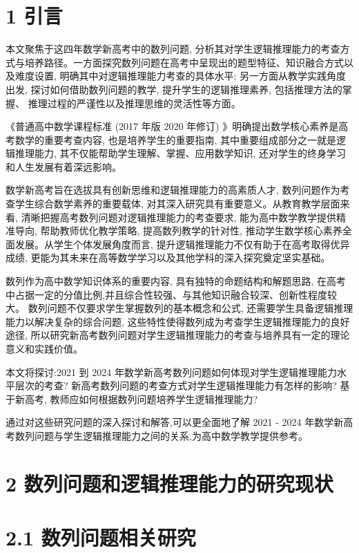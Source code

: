 \documentclass[10pt]{article}
\begin{document}
\section*{1 引言}

本文聚焦于这四年数学新高考中的数列问题, 分析其对学生逻辑推理能力的考查方式与培养路径。一方面探究数列问题在高考中呈现出的题型特征、知识融合方式以及难度设置, 明确其中对逻辑推理能力考查的具体水平; 另一方面从教学实践角度出发, 探讨如何借助数列问题的教学, 提升学生的逻辑推理素养, 包括推理方法的掌握、 推理过程的严谨性以及推理思维的灵活性等方面。

《普通高中数学课程标准 (2017 年版 2020 年修订) 》明确提出数学核心素养是高考数学的重要考查内容, 也是培养学生的重要指南, 其中重要组成部分之一就是逻辑推理能力, 其不仅能帮助学生理解、掌握、应用数学知识, 还对学生的终身学习和人生发展有着深远影响。

数学新高考旨在选拔具有创新思维和逻辑推理能力的高素质人才, 数列问题作为考查学生综合数学素养的重要载体, 对其深入研究具有重要意义。从教育教学层面来看, 清晰把握高考数列问题对逻辑推理能力的考查要求, 能为高中数学教学提供精准导向, 帮助教师优化教学策略, 提高数列教学的针对性, 推动学生数学核心素养全面发展。从学生个体发展角度而言, 提升逻辑推理能力不仅有助于在高考取得优异成绩, 更能为其未来在高等数学学习以及其他学科的深入探究奠定坚实基础。

数列作为高中数学知识体系的重要内容, 具有独特的命题结构和解题思路, 在高考中占据一定的分值比例,并且综合性较强、与其他知识融合较深、创新性程度较大。 数列问题不仅要求学生掌握数列的基本概念和公式, 还需要学生具备逻辑推理能力以解决复杂的综合问题, 这些特性使得数列成为考查学生逻辑推理能力的良好途径, 所以研究新高考数列问题对学生逻辑推理能力的考查与培养具有一定的理论意义和实践价值。

本文将探讨:2021 到 2024 年数学新高考数列问题如何体现对学生逻辑推理能力水平层次的考查? 新高考数列问题的考查方式对学生逻辑推理能力有怎样的影响? 基于新高考, 教师应如何根据数列问题培养学生逻辑推理能力?

通过对这些研究问题的深入探讨和解答,可以更全面地了解 2021 - 2024 年数学新高考数列问题与学生逻辑推理能力之间的关系,为高中数学教学提供参考。

\section*{2 数列问题和逻辑推理能力的研究现状}

\section*{2.1 数列问题相关研究}
\end{document}
